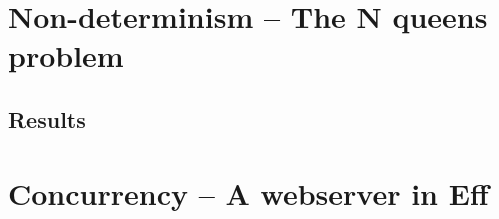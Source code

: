 \documentclass[class=article, crop=false]{standalone}
\begin{document}
\section{Non-determinism -- The N queens problem}

\subsection{Results}

\section{Concurrency -- A webserver in Eff}
\end{document}

